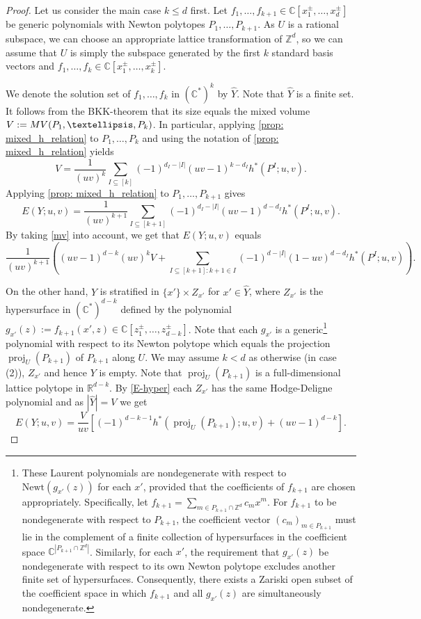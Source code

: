 \documentclass[10pt,a4paper]{amsart}
\newcommand{\C}{\mathbb{C}}
\def\MV{{\rm MV}}
\newcommand{\R}{\mathbb{R}}
\newcommand{\Z}{\mathbb{Z}}
\newcommand{\abs}[1]{\left| #1 \right|}
\renewcommand{\hat}{\widehat}
\DeclareMathOperator{\proj}{proj}
\begin{document}
\begin{proof}
Let us consider the main case $k\leq d$ first. 
Let $f_1, \ldots, f_{k+1} \in \C[x^\pm_1, \ldots, x^\pm_d]$ be generic polynomials with Newton polytopes $P_1,\ldots, P_{k+1}$. As $U$ is a rational subspace, we can choose an appropriate lattice transformation of $\Z^d$, so we can assume that $U$ is simply the subspace generated by the first $k$ standard basis vectors and $f_1, \ldots, f_k \in \C[x^\pm_1, \ldots, x^\pm_k]$.


We denote the solution set of $f_1, \ldots, f_k$ in $(\C^*)^k$ by $\hat{Y}$. Note that $\hat{Y}$ is a finite set. It follows from the BKK-theorem that its size equals the mixed volume $V := \MV(P_1, \ldots, P_k)$. In particular, applying \cref{prop: mixed_h_relation} to $P_1, \ldots, P_k$ and using the notation of \cref{prop: mixed_h_relation} yields
   \begin{equation}V =\frac{1}{(uv)^k} \sum_{I \subseteq[k]} (-1)^{d_I -\abs{I}} (uv-1)^{k-d_I} h^*(P^I; u,v).\label{mv}\end{equation}   
Applying \cref{prop: mixed_h_relation} to $P_1, \ldots, P_{k+1}$ gives
   \[ E (Y; u,v) =\frac{1}{(uv)^{k+1}} \sum_{I \subseteq[k+1]} (-1)^{d_I -\abs{I}} (uv-1)^{d-d_I} h^*(P^I; u,v).\]
By taking \eqref{mv} into account, we get that $E(Y; u,v)$ equals
\begin{equation}
\frac{1}{(uv)^{k+1}} \left((uv-1)^{d-k} (uv)^k V + \sum_{I \subseteq[k+1]: k+1 \in I} (-1)^{d -\abs{I}} (1-uv)^{d-d_I} h^*(P^I; u,v)\right).
\label{E-eq1}
\end{equation}


On the other hand, $Y$ is stratified in $\{x'\} \times Z_{x'}$ for $x' \in \hat{Y}$, where $Z_{x'}$ is the hypersurface in $(\C^*)^{d-k}$ defined by the polynomial $g_{x'}(z):=f_{k+1}(x',z) \in \C[z^\pm_1, \ldots, z^\pm_{d-k}]$. Note that each $g_{x'}$ is a generic\footnote{
These Laurent polynomials are nondegenerate with respect to  $\text{Newt}(g_{x'}(z))$ for each $x'$, provided that the coefficients of $f_{k+1}$ are chosen appropriately. Specifically, let $f_{k+1}= \sum_{m \in P_{k+1} \cap \Z^d} c_m x^m$. For $f_{k+1}$ to be nondegenerate with respect to $P_{k+1}$, the coefficient vector $(c_m)_{m \in P_{k+1}}$ must lie in the complement of a finite collection of hypersurfaces in the coefficient space $\mathbb{C}^{|P_{k+1} \cap \mathbb{Z}^d|}$. Similarly, for each $x'$, the requirement that $g_{x'}(z)$ be nondegenerate with respect to its own Newton polytope excludes another finite set of hypersurfaces. Consequently, there exists a Zariski open subset of the coefficient space in which $f_{k+1}$ and all $g_{x'}(z)$ are simultaneously nondegenerate. } polynomial with respect to its Newton polytope which equals the projection $\proj_U(P_{k+1})$ of $P_{k+1}$ along $U$.  We may assume $k<d$ as otherwise (in case (2)), $Z_{x'}$ and hence $Y$ is empty. Note that $\proj_U(P_{k+1})$ is a full-dimensional lattice polytope in $\R^{d-k}$. By \eqref{E-hyper} each $Z_{x'}$ has the same Hodge-Deligne polynomial and as $|\hat{Y}|=V$ we get
\begin{equation}
E (Y; u,v) =  \frac{V}{uv} \left[(-1)^{d-k-1} h^*(\proj_U(P_{k+1}); u,v) + (uv- 1)^{d-k} \right].
\label{E-eq2}
\end{equation}


\end{proof}
\end{document}
